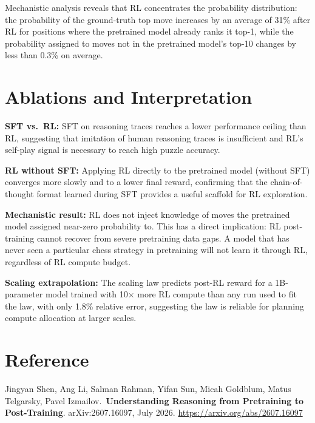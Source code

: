 \documentclass[10pt,twocolumn]{article}
\begin{document}
Mechanistic analysis reveals that RL concentrates the probability
distribution: the probability of the ground-truth top move increases
by an average of 31\% after RL for positions where the pretrained
model already ranks it top-1, while the probability assigned to
moves not in the pretrained model's top-10 changes by less
than 0.3\% on average.

\section{Ablations and Interpretation}

\textbf{SFT vs.\ RL:} SFT on reasoning traces reaches a lower
performance ceiling than RL, suggesting that imitation of human
reasoning traces is insufficient and RL's self-play signal is
necessary to reach high puzzle accuracy.

\textbf{RL without SFT:} Applying RL directly to the pretrained
model (without SFT) converges more slowly and to a lower final
reward, confirming that the chain-of-thought format learned during
SFT provides a useful scaffold for RL exploration.

\textbf{Mechanistic result:} RL does not inject knowledge of moves
the pretrained model assigned near-zero probability to.
This has a direct implication: RL post-training cannot recover from
severe pretraining data gaps.
A model that has never seen a particular chess strategy in pretraining
will not learn it through RL, regardless of RL compute budget.

\textbf{Scaling extrapolation:} The scaling law predicts post-RL
reward for a 1B-parameter model trained with 10$\times$ more RL
compute than any run used to fit the law, with only 1.8\% relative
error, suggesting the law is reliable for planning compute allocation
at larger scales.

\section*{Reference}

Jingyan Shen, Ang Li, Salman Rahman, Yifan Sun, Micah Goldblum,
Matus Telgarsky, Pavel Izmailov.\
\textbf{Understanding Reasoning from Pretraining to Post-Training}.
arXiv:2607.16097, July 2026.
\url{https://arxiv.org/abs/2607.16097}
\end{document}
